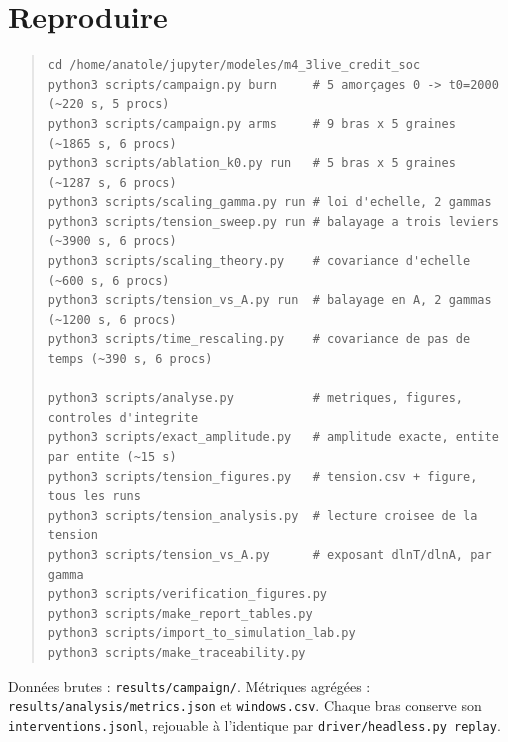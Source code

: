 \documentclass[11pt,a4paper]{article}
\newcommand{\code}[1]{\texttt{#1}}
\begin{document}
\section{Reproduire}

\begin{quote}\footnotesize
\begin{verbatim}
cd /home/anatole/jupyter/modeles/m4_3live_credit_soc
python3 scripts/campaign.py burn     # 5 amorçages 0 -> t0=2000  (~220 s, 5 procs)
python3 scripts/campaign.py arms     # 9 bras x 5 graines        (~1865 s, 6 procs)
python3 scripts/ablation_k0.py run   # 5 bras x 5 graines        (~1287 s, 6 procs)
python3 scripts/scaling_gamma.py run # loi d'echelle, 2 gammas
python3 scripts/tension_sweep.py run # balayage a trois leviers  (~3900 s, 6 procs)
python3 scripts/scaling_theory.py    # covariance d'echelle      (~600 s, 6 procs)
python3 scripts/tension_vs_A.py run  # balayage en A, 2 gammas   (~1200 s, 6 procs)
python3 scripts/time_rescaling.py    # covariance de pas de temps (~390 s, 6 procs)

python3 scripts/analyse.py           # metriques, figures, controles d'integrite
python3 scripts/exact_amplitude.py   # amplitude exacte, entite par entite (~15 s)
python3 scripts/tension_figures.py   # tension.csv + figure, tous les runs
python3 scripts/tension_analysis.py  # lecture croisee de la tension
python3 scripts/tension_vs_A.py      # exposant dlnT/dlnA, par gamma
python3 scripts/verification_figures.py
python3 scripts/make_report_tables.py
python3 scripts/import_to_simulation_lab.py
python3 scripts/make_traceability.py
\end{verbatim}
\end{quote}

Données brutes : \code{results/campaign/}. Métriques agrégées :
\code{results/analysis/metrics.json} et \code{windows.csv}. Chaque bras
conserve son \code{interventions.jsonl}, rejouable à l'identique par
\code{driver/headless.py replay}.
\end{document}
